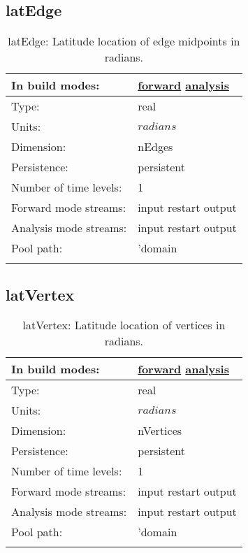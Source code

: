 \subsection[latEdge]{latEdge}
\label{subsec:var_sec_mesh_latEdge}
\begin{center}
\begin{longtable}{| p{2.0in} | p{4.0in} |}
        \hline 
        In build modes: & \hyperref[subsec:forward_var_tab_mesh]{forward} \hyperref[subsec:analysis_var_tab_mesh]{analysis} \\
        \hline 
        Type: & real \\
        \hline 
        Units: & $radians$ \\
        \hline 
        Dimension: & nEdges \\
        \hline 
        Persistence: & persistent \\
        \hline 
        Number of time levels: & 1 \\
        \hline 
		 Forward mode streams: &  input restart output \\
        \hline 
		 Analysis mode streams: &  input restart output \\
        \hline 
            Pool path: & 'domain %
 \\
		 \hline 
    \caption{latEdge: Latitude location of edge midpoints in radians.}
\end{longtable}
\end{center}
\subsection[latVertex]{latVertex}
\label{subsec:var_sec_mesh_latVertex}
\begin{center}
\begin{longtable}{| p{2.0in} | p{4.0in} |}
        \hline 
        In build modes: & \hyperref[subsec:forward_var_tab_mesh]{forward} \hyperref[subsec:analysis_var_tab_mesh]{analysis} \\
        \hline 
        Type: & real \\
        \hline 
        Units: & $radians$ \\
        \hline 
        Dimension: & nVertices \\
        \hline 
        Persistence: & persistent \\
        \hline 
        Number of time levels: & 1 \\
        \hline 
		 Forward mode streams: &  input restart output \\
        \hline 
		 Analysis mode streams: &  input restart output \\
        \hline 
            Pool path: & 'domain %
 \\
		 \hline 
    \caption{latVertex: Latitude location of vertices in radians.}
\end{longtable}
\end{center}
